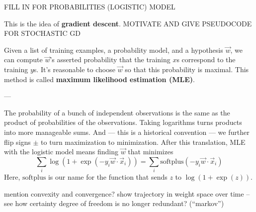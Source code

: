 \documentclass[11pt, justified]{tufte-book}
\newcommand{\attnsam}[1]{{\red \textsf{#1}}}
\newcommand{\samsubsubsection}[1]{
   \vspace{0.1cm}
   \par\noindent{\hspace{-2cm}\normalsize \sc \gre #1} ---
}
\theoremstyle{definition}
\begin{document}
        \attnsam{FILL IN FOR PROBABILITIES (LOGISTIC) MODEL} 

        This is the idea of \textbf{gradient descent}.
        \attnsam{MOTIVATE AND GIVE PSEUDOCODE FOR STOCHASTIC GD} 

        Given a list of training examples, a probability model, and a
        hypothesis $\vec w$, we can compute $\vec w$'s asserted probability
        that the training $x$s correspond to the training $y$s.  It's
        reasonable to choose $\vec w$ so that this probability is maximal.
        This method is called \textbf{maximum likelihood estimation (MLE)}.
        
      \samsubsubsection{logistic models} %

        The probability of a bunch of independent observations is the same as
        the product of probabilities of the observations.  Taking logarithms
        turns products into more manageable sums.  And --- this is a historical
        convention --- we further flip signs $\pm$ to turn maximization to 
        minimization.
        After this translation, MLE with the logistic model means finding $\vec
        w$ that minimizes
        $$
          \sum_i \log(1+\exp(-y_i\vec w\cdot \vec x_i))
          =
          \sum_i \text{softplus}(-y_i\vec w\cdot \vec x_i) 
        $$
        Here, $\text{softplus}$ is our name for the function that sends
        $z$ to $\log(1+\exp(z))$.


        \attnsam{mention convexity and convergence?}
        \attnsam{show trajectory in weight space over time -- see how certainty degree of freedom is no longer redundant? (``markov'')}
\end{document}
